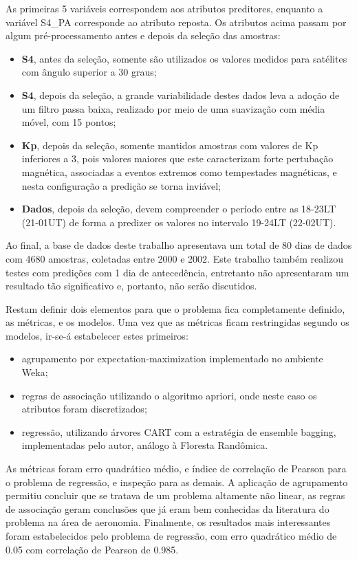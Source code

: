 As primeiras 5 variáveis correspondem aos atributos preditores, enquanto a variável S4\_PA corresponde ao atributo reposta. Os atributos acima passam por algum pré-processamento antes e depois da seleção das amostras:

\begin{itemize}
\item {\bf S4}, antes da seleção, somente são utilizados os valores medidos para satélites com ângulo superior a 30 graus;
\item {\bf S4}, depois da seleção, a grande variabilidade destes dados leva a adoção de um filtro passa baixa, realizado por meio de uma suavização com média móvel, com 15 pontos;
\item {\bf Kp}, depois da seleção, somente mantidos amostras com valores de Kp inferiores a 3, pois valores maiores que este caracterizam forte pertubação magnética, associadas a eventos extremos como tempestades magnéticas, e nesta configuração a predição se torna inviável;
\item {\bf Dados}, depois da seleção, devem compreender o período  entre as 18-23LT (21-01UT) de forma a predizer os valores no intervalo 19-24LT (22-02UT).
\end{itemize}

Ao final, a base de dados deste trabalho apresentava um total de 80 dias de dados com 4680 amostras, coletadas entre 2000 e 2002. Este trabalho também realizou testes com predições com 1 dia de antecedência, entretanto não apresentaram um resultado tão significativo e, portanto, não serão discutidos.

Restam definir dois elementos para que o problema fica completamente definido, as métricas, e os modelos. Uma vez que as métricas ficam restringidas segundo os modelos, ir-se-á estabelecer estes primeiros:

\begin{itemize}
\item agrupamento por expectation-maximization implementado no ambiente Weka;
\item regras de associação utilizando o algoritmo apriori, onde neste caso os atributos foram discretizados;
\item regressão, utilizando árvores CART com a estratégia de ensemble bagging, implementadas pelo autor, análogo à Floresta Randômica.
\end{itemize}

As métricas foram erro quadrático médio, e índice de correlação de Pearson para o problema de regressão, e inspeção para as demais. A aplicação de agrupamento permitiu concluir que se tratava de um problema altamente não linear, as regras de associação geram conclusões que já eram bem conhecidas da literatura do problema na área de aeronomia. Finalmente, os resultados mais interessantes foram estabelecidos pelo problema de regressão, com erro quadrático médio de 0.05 com correlação de Pearson de 0.985.

